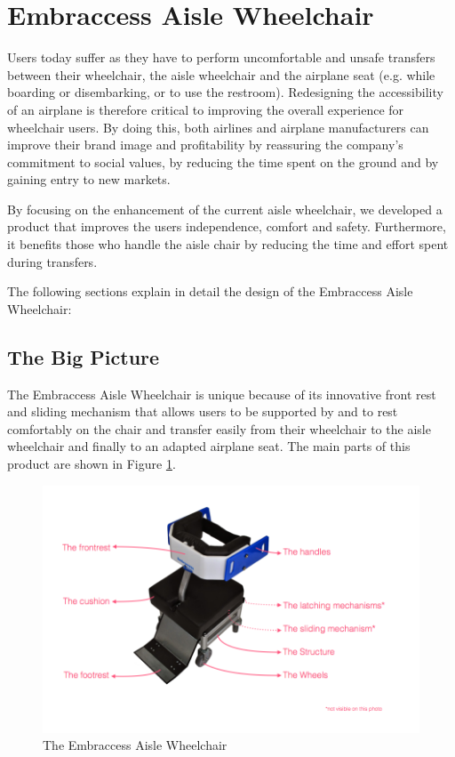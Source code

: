 \section{Embraccess Aisle Wheelchair}

Users today suffer as they have to perform uncomfortable and unsafe transfers between their wheelchair, the aisle wheelchair and the airplane seat (e.g. while boarding or disembarking, or to use the restroom). Redesigning the accessibility of an airplane is therefore critical to improving the overall experience for wheelchair users. By doing this, both airlines and airplane manufacturers can improve their brand image and profitability by reassuring the company's commitment to social values, by reducing the time spent on the ground and by gaining entry to new markets.

By focusing on the enhancement of the current aisle wheelchair, we developed a product that improves the users independence, comfort and safety. Furthermore, it benefits those who handle the aisle chair by reducing the time and effort spent during transfers.

The following sections explain in detail the design of the Embraccess Aisle Wheelchair:

\subsection{The Big Picture}

The Embraccess Aisle Wheelchair is unique because of its innovative front rest and sliding mechanism that allows users to be supported by and to rest comfortably on the chair and transfer easily from their wheelchair to the aisle wheelchair and finally to an adapted airplane seat. The main parts of this product are shown in Figure \ref{fig:wheelchair}. 

\begin{figure}[h]
\centering
\includegraphics[width=13cm]{images/AisleWheelchair1.png}
\caption{The Embraccess Aisle Wheelchair}
\label{fig:wheelchair}
\end{figure}


